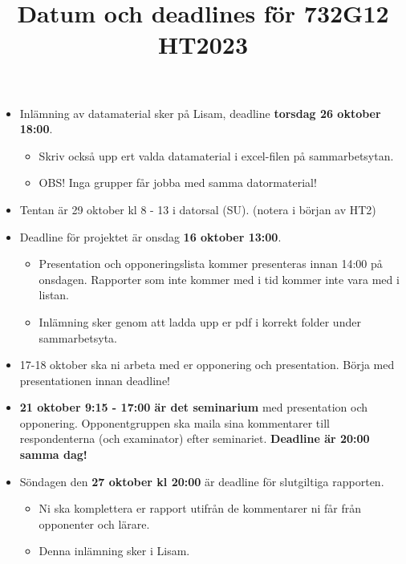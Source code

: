 \documentclass[a4paper]{article}
\title{Datum och deadlines för 732G12 HT2023}
\author{}
\date{}
\begin{document}
\maketitle
\thispagestyle{fancy}

\begin{itemize}
    \item Inlämning av datamaterial sker på Lisam, deadline \textbf{torsdag 26 oktober 18:00}.
    \begin{itemize}
        \item Skriv också upp ert valda datamaterial i excel-filen på sammarbetsytan.
        \item OBS! Inga grupper får jobba med samma datormaterial!
    \end{itemize}
    \item Tentan är 29 oktober kl 8 - 13 i datorsal (SU). (notera i början av HT2)
    \item Deadline för projektet är onsdag \textbf{16 oktober 13:00}.
    \begin{itemize}
        \item Presentation och opponeringslista kommer presenteras innan 14:00 på onsdagen. Rapporter som inte kommer med i tid kommer inte vara med i listan.
        \item Inlämning sker genom att ladda upp er pdf i korrekt folder under sammarbetsyta.
    \end{itemize}
    \item 17-18 oktober ska ni arbeta med er opponering och presentation. Börja med presentationen innan deadline!
    \item \textbf{21 oktober 9:15 - 17:00 är det seminarium} med presentation och opponering. Opponentgruppen ska maila sina kommentarer till respondenterna (och examinator) efter seminariet. \textbf{Deadline är 20:00 samma dag!}
    \item Söndagen den \textbf{27 oktober kl 20:00} är deadline för slutgiltiga rapporten.
    \begin{itemize}
        \item Ni ska komplettera er rapport utifrån de kommentarer ni får från opponenter och lärare.
        \item Denna inlämning sker i Lisam.
    \end{itemize}
\end{itemize}
\end{document}
